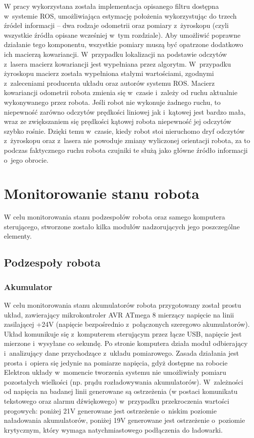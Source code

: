 W pracy wykorzystana została implementacja opisanego filtru dostępna w~systemie ROS,
umożliwiająca estymację położenia wykorzystując do trzech źródeł informacji -- dwa rodzaje
odometrii oraz pomiary z~żyroskopu (czyli wszystkie źródła opisane wcześniej w~tym rozdziale).
Aby umożliwić poprawne działanie tego komponentu, wszystkie pomiary muszą być opatrzone
dodatkowo ich macierzą kowariancji. W~przypadku lokalizacji na podstawie odczytów z~lasera
macierz kowariancji jest wypełniana przez algorytm. W~przypadku żyroskopu macierz
została wypełniona stałymi wartościami, zgodnymi z~zaleceniami producenta układu oraz
autorów systemu ROS. Macierz kowariancji odometrii robota zmienia się w~czasie i~zależy
od ruchu aktualnie wykonywanego przez robota. Jeśli robot nie wykonuje żadnego ruchu,
to niepewność zarówno odczytów prędkości liniowej jak i~kątowej jest bardzo mała,
wraz ze zwiększaniem się prędkości kątowej robota niepewność jej odczytów szybko rośnie.
Dzięki temu w~czasie, kiedy robot stoi nieruchomo dryf odczytów z~żyroskopu oraz z~lasera
nie powoduje zmiany wyliczonej orientacji robota, za to podczas faktycznego ruchu robota
czujniki te służą jako główne źródło informacji o~jego obrocie.

\section{Monitorowanie stanu robota}

W celu monitorowania stanu podzespołów robota oraz samego komputera sterującego,
stworzone zostało kilka modułów nadzorujących jego poszczególne elementy.

\subsection{Podzespoły robota}

\subsubsection{Akumulator}

W celu monitorowania stanu akumulatorów robota przygotowany został prostu układ,
zawierający mikrokontroler AVR ATmega 8 mierzący napięcie na linii
zasilającej +24V (napięcie bezpośrednio z~połączonych szeregowo akumulatorów).
Układ komunikuje się z~komputerem sterującym przez łącze USB, napięcie jest
mierzone i~wysyłane co sekundę. Po stronie komputera działa moduł odbierający 
i~analizujący dane przychodzące z~układu pomiarowego. Zasada działania jest prosta
i~opiera się jedynie na pomiarze napięcia, gdyż dostępne na robocie Elektron
układy w~momencie tworzenia systemu nie umożliwiały pomiaru pozostałych
wielkości (np. prądu rozładowywania akumulatorów). W~zależności od napięcia na
badanej linii generowane są ostrzeżenia (w postaci komunikatu tekstowego oraz
alarmu dźwiękowego) w~przypadku przekroczenia wartości progowych: poniżej 21V
generowane jest ostrzeżenie o~niskim poziomie naładowania akumulatorów, poniżej
19V generowane jest ostrzeżenie o~poziomie krytycznym, który wymaga
natychmiastowego podłączenia do ładowarki.

